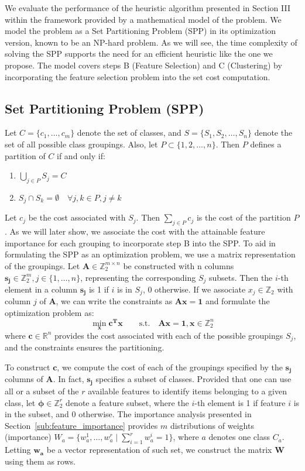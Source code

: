 
We evaluate the performance of the heuristic algorithm presented in Section III  within the framework provided by a mathematical model of the problem.
We model the problem as a Set Partitioning Problem (SPP) in its optimization version, known to be an NP-hard problem.
As we will see, the time complexity of solving the SPP supports the need for an efficient heuristic like the one we propose.
The model covers steps B (Feature Selection) and C (Clustering) by incorporating the feature selection problem into the set cost computation.
\subsection{Set Partitioning Problem (SPP)}
Let $C=\{c_1, \dots, c_m \}$ denote the set of classes, and $S=\{S_1,S_2,\dots,S_n\}$  denote the set of all possible class groupings.
Also, let $P \subset \{1,2,\dots,n\}$.
Then $P$ defines a partition of $C$ if and only if:
\begin{enumerate}
    \item $\bigcup_{j\in P}S_{j}= C$
    \item $S_j \cap S_k = \emptyset \quad \forall j,k \in P, j\neq k$
\end{enumerate}
Let $c_j$ be the cost associated with $S_j$. Then $\sum_{j \in P} c_j$ is the cost of the partition $P$.
As we will later show, we associate the cost with the attainable feature importance for each grouping to incorporate step B into the SPP.
To aid in formulating the SPP as an optimization problem, we use a matrix representation of the groupings.
Let $\pmb{A} \in \mathbb{Z}_2^{m \times n}$ be constructed with n columns $\pmb{s_j} \in \mathbb{Z}_2^m, j \in \{1,\dots,n\}$, representing the corresponding $S_j$ subsets.
Then the $i$-th element in a column $\pmb{s_j}$ is 1 if $i$ is in $S_j$, 0 otherwise.
If we associate $x_j \in \mathbb{Z}_2$ with column $j$ of $\pmb{A}$, we can write the constraints as
$\pmb{Ax}=\pmb{1}$ and formulate the optimization problem as:
\begin{equation}
\min_{\pmb{x}} \pmb{c^Tx} \qquad \text{s.t.} \quad \pmb{Ax}=\pmb{1}, \pmb{x} \in \mathbb{Z}_2^n
\label{eq:opt-objective}
\end{equation}
where $\pmb{c} \in \mathbb{R}^n$ provides the cost associated with each of the possible groupings $S_j$, and the constraints ensures the partitioning.

To construct $\pmb{c}$, we compute the cost of each of the groupings specified by the $\pmb{s_j}$ columns of $\pmb{A}$.
In fact, $\pmb{s_j}$ specifies a subset of classes.
Provided that one can use all or a subset of the $r$ available features to identify items belonging to a given class, let $\pmb{\phi} \in \mathbb{Z}^r_2$ denote a feature subset, where the $i$-th element is 1 if feature $i$ is in the subset, and 0 otherwise.
The importance analysis presented in Section~\ref{sub:feature_importance} provides $m$ distributions of weights (importance) $W_a=\{w_a^1,\dots, w_a^r \mid \sum_{i=1}^r w_a^i = 1 \}$, where $a$ denotes one class $C_a$. Letting $\pmb{w_a}$ be a vector representation of such set, we construct the matrix $\pmb{W}$ using them as rows.

